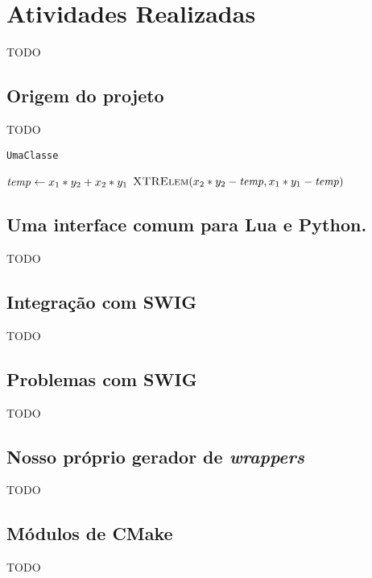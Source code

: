 \def\classname#1{\texttt{#1}}

\chapter{Atividades Realizadas}
\label{sec:atividades}
TODO

\section{Origem do projeto}
\label{sec:atividades:origem}

TODO

\classname{UmaClasse} 

\begin{codebox}
    \zi $\id{temp} \gets x_1 * y_2 + x_2 * y_1$
    \zi \Return $\proc{XTRElem}(x_2 * y_2 - \id{temp}, x_1 * y_1 -
    \id{temp})$
\end{codebox}

\section{Uma interface comum para Lua e Python.}
\label{sec:atividades:opa}

TODO

\section{Integração com SWIG}

TODO

\section{Problemas com SWIG}

TODO

\section{Nosso próprio gerador de \emph{wrappers}}

TODO

\section{Módulos de CMake}

TODO
